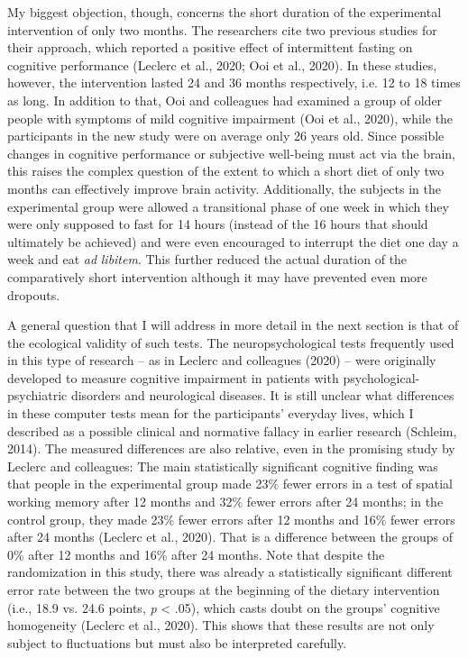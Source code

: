 \documentclass[authordate, empirical]{jote-new-article}
\begin{document}
My biggest objection, though, concerns the short duration of the experimental intervention of only two months. The researchers cite two previous studies for their approach, which reported a positive effect of intermittent fasting on cognitive performance (Leclerc et al., 2020; Ooi et al., 2020). In these studies, however, the intervention lasted 24 and 36 months respectively, i.e. 12 to 18 times as long. In addition to that, Ooi and colleagues had examined a group of older people with symptoms of mild cognitive impairment (Ooi et al., 2020), while the participants in the new study were on average only 26 years old. Since possible changes in cognitive performance or subjective well-being must act via the brain, this raises the complex question of the extent to which a short diet of only two months can effectively improve brain activity. Additionally, the subjects in the experimental group were allowed a transitional phase of one week in which they were only supposed to fast for 14 hours (instead of the 16 hours that should ultimately be achieved) and were even encouraged to interrupt the diet one day a week and eat \emph{ad }\emph{libitem}. This further reduced the actual duration of the comparatively short intervention although it may have prevented even more dropouts.







A general question that I will address in more detail in the next section is that of the ecological validity of such tests. The neuropsychological tests frequently used in this type of research -- as in Leclerc and colleagues (2020) -- were originally developed to measure cognitive impairment in patients with psychological-psychiatric disorders and neurological diseases. It is still unclear what differences in these computer tests mean for the participants' everyday lives, which I described as a possible clinical and normative fallacy in earlier research (Schleim, 2014). The measured differences are also relative, even in the promising study by Leclerc and colleagues: The main statistically significant cognitive finding was that people in the experimental group made 23\% fewer errors in a test of spatial working memory after 12 months and 32\% fewer errors after 24 months; in the control group, they made 23\% fewer errors after 12 months and 16\% fewer errors after 24 months (Leclerc et al., 2020). That is a difference between the groups of 0\% after 12 months and 16\% after 24 months. Note that despite the randomization in this study, there was already a statistically significant different error rate between the two groups at the beginning of the dietary intervention (i.e., 18.9 vs. 24.6 points, \emph{p }< .05), which casts doubt on the groups' cognitive homogeneity (Leclerc et al., 2020). This shows that these results are not only subject to fluctuations but must also be interpreted carefully.
\end{document}
